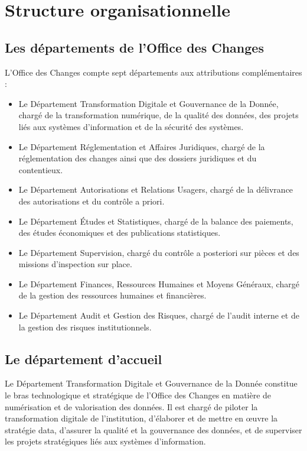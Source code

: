 \section{Structure organisationnelle}

\subsection{Les départements de l'Office des Changes}

L'Office des Changes compte sept départements aux attributions complémentaires :

\begin{itemize}
    \item Le Département Transformation Digitale et Gouvernance de la Donnée, chargé de la transformation numérique, de la qualité des données, des projets liés aux systèmes d'information et de la sécurité des systèmes.
    \item Le Département Réglementation et Affaires Juridiques, chargé de la réglementation des changes ainsi que des dossiers juridiques et du contentieux.
    \item Le Département Autorisations et Relations Usagers, chargé de la délivrance des autorisations et du contrôle a priori.
    \item Le Département Études et Statistiques, chargé de la balance des paiements, des études économiques et des publications statistiques.
    \item Le Département Supervision, chargé du contrôle a posteriori sur pièces et des missions d'inspection sur place.
    \item Le Département Finances, Ressources Humaines et Moyens Généraux, chargé de la gestion des ressources humaines et financières.
    \item Le Département Audit et Gestion des Risques, chargé de l'audit interne et de la gestion des risques institutionnels.
\end{itemize}

\subsection{Le département d'accueil}

Le Département Transformation Digitale et Gouvernance de la Donnée constitue le bras technologique et stratégique de l'Office des Changes en matière de numérisation et de valorisation des données. Il est chargé de piloter la transformation digitale de l'institution, d'élaborer et de mettre en œuvre la stratégie data, d'assurer la qualité et la gouvernance des données, et de superviser les projets stratégiques liés aux systèmes d'information.

